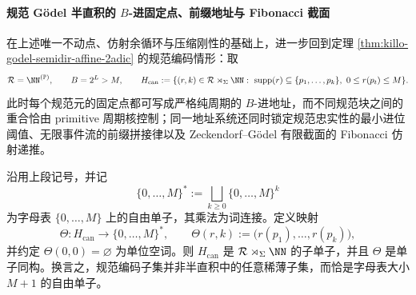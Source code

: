 \paragraph{规范 Gödel 半直积的 \texorpdfstring{$B$}{B}-进固定点、前缀地址与 Fibonacci 截面}
在上述唯一不动点、仿射余循环与压缩刚性的基础上，进一步回到定理 \ref{thm:killo-godel-semidir-affine-2adic} 的规范编码情形：取
\[
\mathcal R=\NN^{(\mathbb P)},
\qquad
B=2^L>M,
\qquad
H_{\mathrm{can}}
:=
\{(r,k)\in \mathcal R\rtimes_{\Sigma}\NN:\ \mathrm{supp}(r)\subseteq\{p_1,\dots,p_k\},\ 0\le r(p_t)\le M\}.
\]
此时每个规范元的固定点都可写成严格纯周期的 \(B\)-进地址，而不同规范块之间的重合恰由 primitive 周期核控制；同一地址系统还同时锁定规范忠实性的最小进位阈值、无限事件流的前缀拼接律以及 Zeckendorf--Gödel 有限截面的 Fibonacci 仿射递推。

\begin{theorem}[规范编码子单子与有限字母自由单子的严格同构]\label{thm:xi-time-part9g-canonical-submonoid-free-monoid}
沿用上段记号，并记
\[
\{0,\dots,M\}^{\ast}:=\bigsqcup_{k\ge 0}\{0,\dots,M\}^{k}
\]
为字母表 \(\{0,\dots,M\}\) 上的自由单子，其乘法为词连接。定义映射
\[
\Theta:H_{\mathrm{can}}\longrightarrow \{0,\dots,M\}^{\ast},
\qquad
\Theta(r,k):=\bigl(r(p_1),\dots,r(p_k)\bigr),
\]
并约定 \(\Theta(0,0)=\varnothing\) 为单位空词。则 \(H_{\mathrm{can}}\) 是
\(
\mathcal R\rtimes_{\Sigma}\NN
\)
的子单子，并且 \(\Theta\) 是单子同构。换言之，规范编码子集并非半直积中的任意稀薄子集，而恰是字母表大小 \(M+1\) 的自由单子。
\end{theorem}
